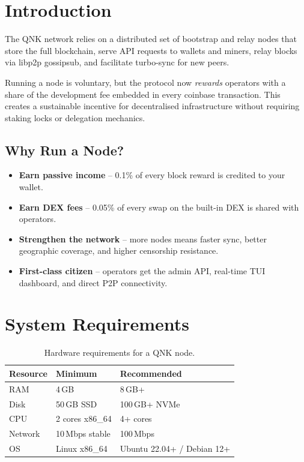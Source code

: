 \documentclass[11pt,a4paper]{article}
\begin{document}
\tableofcontents
\newpage

\section{Introduction}

The QNK network relies on a distributed set of bootstrap and relay nodes that
store the full blockchain, serve API requests to wallets and miners, relay
blocks via libp2p gossipsub, and facilitate turbo-sync for new peers.

Running a node is voluntary, but the protocol now \emph{rewards} operators
with a share of the development fee embedded in every coinbase transaction.
This creates a sustainable incentive for decentralised infrastructure
without requiring staking locks or delegation mechanics.

\subsection{Why Run a Node?}

\begin{itemize}[nosep]
    \item \textbf{Earn passive income} -- 0.1\% of every block reward is credited to your wallet.
    \item \textbf{Earn DEX fees} -- 0.05\% of every swap on the built-in DEX is shared with operators.
    \item \textbf{Strengthen the network} -- more nodes means faster sync, better geographic coverage, and higher censorship resistance.
    \item \textbf{First-class citizen} -- operators get the admin API, real-time TUI dashboard, and direct P2P connectivity.
\end{itemize}

\section{System Requirements}

\begin{table}[H]
\centering
\begin{tabular}{@{}lll@{}}
\toprule
\textbf{Resource} & \textbf{Minimum} & \textbf{Recommended} \\
\midrule
RAM        & 4\,GB              & 8\,GB+ \\
Disk       & 50\,GB SSD         & 100\,GB+ NVMe \\
CPU        & 2 cores x86\_64    & 4+ cores \\
Network    & 10\,Mbps stable    & 100\,Mbps \\
OS         & Linux x86\_64      & Ubuntu 22.04+ / Debian 12+ \\
\bottomrule
\end{tabular}
\caption{Hardware requirements for a QNK node.}
\end{table}
\end{document}
